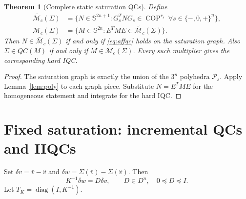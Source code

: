 \documentclass[10pt,a4paper]{article}
\newtheorem{theorem}{Theorem}
\theoremstyle{definition}
\theoremstyle{remark}
\newcommand{\Ss}{\mathbb S}
\newcommand{\COP}{\operatorname{COP}}
\newcommand{\diag}{\operatorname{diag}}
\newcommand{\mc}{\mathcal M_c}
\begin{document}
\begin{theorem}[Complete static saturation QCs]\label{thm:satqc}
Define
\begin{align}
 \widetilde{\mc}(\Sigma)
 &=\{N\in\Ss^{2n+1}:G_s^TNG_s\in\COP^{r_s}\ \forall s\in\{-,0,+\}^n\},\label{eq:sat-aff-cone}\\
 \mc(\Sigma)
 &=\{M\in\Ss^{2n}:E^TME\in\widetilde{\mc}(\Sigma)\}.\label{eq:sat-cone}
\end{align}
Then $N\in\widetilde{\mc}(\Sigma)$ if and only if \eqref{eq:affqc} holds on the saturation graph. Also $\Sigma\in QC(M)$ if and only if $M\in\mc(\Sigma)$. Every such multiplier gives the corresponding hard IQC.
\end{theorem}
\begin{proof}
The saturation graph is exactly the union of the $3^n$ polyhedra $\mathcal P_s$. Apply Lemma~\ref{lem:poly} to each graph piece. Substitute $N=E^TME$ for the homogeneous statement and integrate for the hard IQC.
\end{proof}

\section{Fixed saturation: incremental QCs and IIQCs}
Set $\delta v=\bar v-\hat v$ and $\delta w=\Sigma(\bar v)-\Sigma(\hat v)$. Then
\begin{equation}\label{eq:sat-slope}
 K^{-1}\delta w=D\delta v,\qquad D\in D^n,\quad0\preceq D\preceq I.
\end{equation}
Let $T_K=\diag(I,K^{-1})$.
\end{document}
